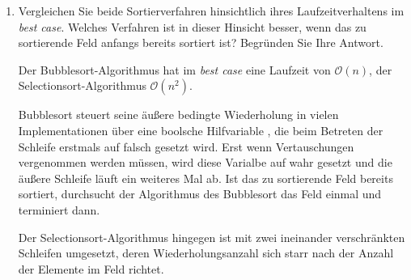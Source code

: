 \documentclass{bschlangaul-aufgabe}
\begin{document}
\begin{enumerate}

\item Vergleichen Sie beide Sortierverfahren hinsichtlich ihres
Laufzeitverhaltens im \emph{best case}. Welches Verfahren ist in dieser
Hinsicht besser, wenn das zu sortierende Feld anfangs bereits sortiert
ist? Begründen Sie Ihre Antwort.

\begin{bAntwort}
Der Bubblesort-Algorithmus hat im \emph{best case} eine Laufzeit von
$\mathcal{O}(n)$, der Selectionsort-Algorithmus $\mathcal{O}(n^2)$.

Bubblesort steuert seine äußere bedingte Wiederholung in vielen
Implementationen über eine boolsche Hilfvariable ,
die beim Betreten der Schleife erstmals auf falsch gesetzt wird. Erst
wenn Vertauschungen vergenommen werden müssen, wird diese Varialbe auf
wahr gesetzt und die äußere Schleife läuft ein weiteres Mal ab. Ist das
zu sortierende Feld bereits sortiert, durchsucht der Algorithmus des
Bubblesort das Feld einmal und terminiert dann.

Der Selectionsort-Algorithmus hingegen ist mit zwei ineinander
verschränkten Schleifen umgesetzt, deren Wiederholungsanzahl sich starr
nach der Anzahl der Elemente im Feld richtet.




\end{bAntwort}

\end{enumerate}
\end{document}
